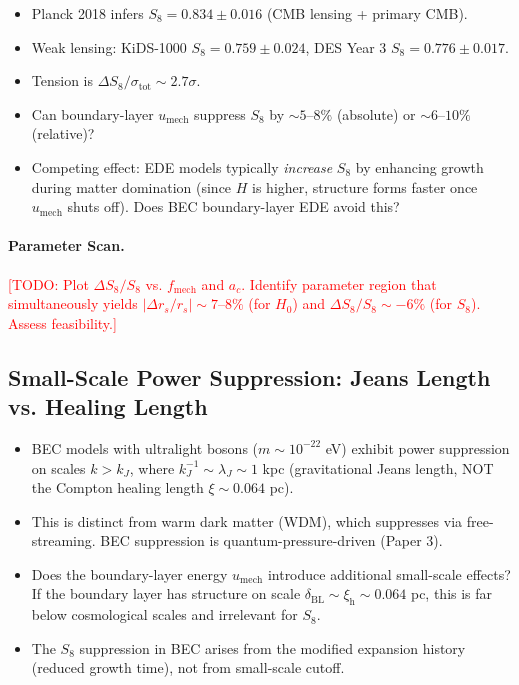 \documentclass[11pt,a4paper]{article}
\newcommand{\umech}{\ensuremath{u_{\mathrm{mech}}}}
\newcommand{\fmech}{\ensuremath{f_{\mathrm{mech}}}}
\newcommand{\ac}{\ensuremath{a_c}}
\newcommand{\rs}{\ensuremath{r_s}}
\newcommand{\xih}{\ensuremath{\xi_{\mathrm{h}}}}
\newcommand{\deltaBL}{\ensuremath{\delta_{\mathrm{BL}}}}
\newcommand{\lambdaJ}{\ensuremath{\lambda_J}}
\theoremstyle{definition}
\theoremstyle{remark}
\begin{document}
\begin{itemize}[leftmargin=*, itemsep=0.3em]
\item Planck 2018 infers $S_8 = 0.834 \pm 0.016$ (CMB lensing + primary CMB).
\item Weak lensing: KiDS-1000 $S_8 = 0.759 \pm 0.024$, DES Year 3 $S_8 = 0.776 \pm 0.017$.
\item Tension is $\Delta S_8 / \sigma_{\mathrm{tot}} \sim 2.7\sigma$.
\item Can boundary-layer $\umech$ suppress $S_8$ by $\sim 5$--$8\%$ (absolute) or $\sim 6$--$10\%$ (relative)?
\item Competing effect: EDE models typically \emph{increase} $S_8$ by enhancing growth during matter domination (since $H$ is higher, structure forms faster once $\umech$ shuts off). Does BEC boundary-layer EDE avoid this?
\end{itemize}

\paragraph{Parameter Scan.}
\textcolor{red}{[TODO: Plot $\Delta S_8/S_8$ vs. $\fmech$ and $\ac$. Identify parameter region that simultaneously yields $|\Delta\rs/\rs| \sim 7$--$8\%$ (for $H_0$) and $\Delta S_8/S_8 \sim -6\%$ (for $S_8$). Assess feasibility.]}

\subsection{Small-Scale Power Suppression: Jeans Length vs. Healing Length}
\label{sec:small_scale}

\begin{itemize}[leftmargin=*, itemsep=0.3em]
\item BEC models with ultralight bosons ($m \sim 10^{-22}$ eV) exhibit power suppression on scales $k > k_J$, where $k_J^{-1} \sim \lambdaJ \sim 1$ kpc (gravitational Jeans length, NOT the Compton healing length $\xi \sim 0.064$ pc).
\item This is distinct from warm dark matter (WDM), which suppresses via free-streaming. BEC suppression is quantum-pressure-driven (Paper 3).
\item Does the boundary-layer energy $\umech$ introduce additional small-scale effects? If the boundary layer has structure on scale $\deltaBL \sim \xih \sim 0.064$ pc, this is far below cosmological scales and irrelevant for $S_8$.
\item The $S_8$ suppression in BEC arises from the modified expansion history (reduced growth time), not from small-scale cutoff.
\end{itemize}
\end{document}
